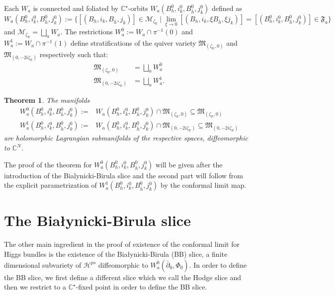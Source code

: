 \documentclass[12pt,oneside,reqno]{amsart}
\newtheorem{theorem}{Theorem}
\theoremstyle{definition}
\numberwithin{equation}{section}
\numberwithin{theorem}{section}
\newcommand{\R}{\mathbb{R}}
\newcommand{\C}{\mathbb{C}}
\renewcommand{\subset}{\subseteq}
\newcommand{\pa}{\partial}
\begin{document}
%
Each $W_a$ is connected and foliated by $\C^{\star}$-orbits $W_a(B_h^0,i_k^0,B_{\bar h}^0,j_k^0)$ defined as 
%
\begin{equation*}
W_a(B_h^0,i_k^0,B_{\bar h}^0,j_k^0):= \{[(B_h,i_k,B_{\bar h},j_k)]\in \mathcal M_{\zeta_{\R}}~|~\lim\limits_{\xi\to 0}[(B_h,i_k,\xi B_{\bar h},\xi j_k)]= [(B_h^0,i_k^0,B_{\bar h}^0,j_k^0)] \in \mathfrak F_a\}
\end{equation*}
%
and $\mathcal M_{\zeta_{\R}} = \bigsqcup\limits_{a} W_a$. The restrictions $W_a^0 := W_a \cap \pi^{-1}(0)$ and $W_a^1:= W_a\cap \pi^{-1}(1)$ define stratifications of the quiver variety $\mathfrak{M}_{(\zeta_\R,0)}$ and $\mathfrak{M}_{(0,-2i\zeta_\R)}$ respectively such that:
%
\begin{equation}
\begin{split}
        \mathfrak{M}_{(\zeta_\R,0)}&=\bigsqcup_a W_a^0 \\
    \mathfrak{M}_{(0,-2i\zeta_\R)}&=\bigsqcup_a W^1_a.
    \end{split}
\end{equation}
%
%
\begin{theorem}
The manifolds 
%
\begin{equation}
\begin{split}
W_a^0(B_h^0,i_k^0,B_{\bar h}^0,j_k^0) :=& W_a(B_h^0,i_k^0,B_{\bar h}^0,j_k^0)\cap \mathfrak M_{(\zeta_{\R},0)} \subset \mathfrak M_{(\zeta_{\R},0)}\\
W_a^1(B_h^0,i_k^0,B_{\bar h}^0,j_k^0) :=& W_a(B_h^0,i_k^0,B_{\bar h}^0,j_k^0)\cap \mathfrak M_{(0,-2i\zeta_{\R})} \subset \mathfrak M_{(0,-2i\zeta_{\R})}
\end{split}
\end{equation}
%
are holomorphic Lagrangian submanifolds of the respective spaces, diffeomorphic to $\C^N$. 
\end{theorem}
%
The proof of the theorem for $W_a^0(B_h^0,i_k^0,B_{\bar h}^0,j_k^0)$ will be given after the introduction of the Bialynicki-Birula slice and the second part will follow from the explicit parametrization of $W_a^1(B_h^0,i_k^0,B_{\bar h}^0,j_k^0)$ by the conformal limit map. 








\section{The Bia\l{}ynicki-Birula slice}

The other main ingredient in the proof of existence of the conformal limit for Higgs bundles is the existence of the Bia\l{}ynicki-Birula (BB) slice, a finite dimensional subvariety of $\mathcal H^{ps}$ diffeomorphic to $W^0_a(\bar\pa_0,\Phi_0)$. In order to define the BB slice, we first define a different slice which we call the Hodge slice and then we restrict to a $\C^{\star}$-fixed point in order to define the BB slice. 
\end{document}
